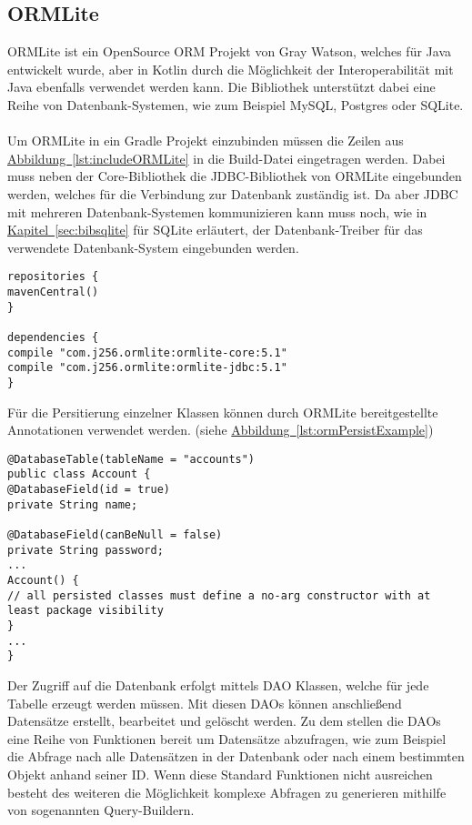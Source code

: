 \subsection{ORMLite}\label{sec:bibormlite}
ORMLite ist ein OpenSource \gls{ORM} Projekt von Gray Watson, welches für Java entwickelt wurde, aber in Kotlin durch die Möglichkeit der Interoperabilität mit Java ebenfalls verwendet werden kann. Die Bibliothek unterstützt dabei eine Reihe von Datenbank-Systemen, wie zum Beispiel MySQL, Postgres oder SQLite.\\
\\
Um ORMLite in ein Gradle Projekt einzubinden müssen die Zeilen aus \hyperref[lst:includeORMLite]{Abbildung~\ref{lst:includeORMLite}} in die Build-Datei eingetragen werden. Dabei muss neben der Core-Bibliothek die \gls{JDBC}-Bibliothek von ORMLite eingebunden werden, welches für die Verbindung zur Datenbank zuständig ist. Da aber \gls{JDBC} mit mehreren Datenbank-Systemen kommunizieren kann muss noch, wie in \hyperref[sec:bibsqlite]{Kapitel~\ref{sec:bibsqlite}} für SQLite erläutert, der Datenbank-Treiber für das verwendete Datenbank-System eingebunden werden.
\begin{lstlisting}[style=lstStyleFramed, caption={Einbindung der Bibliothek ORMLite mithilfe von Gradle}, label=lst:includeORMLite]
repositories {
mavenCentral()
}

dependencies {
compile "com.j256.ormlite:ormlite-core:5.1"
compile "com.j256.ormlite:ormlite-jdbc:5.1"
}
\end{lstlisting}
Für die Persitierung einzelner Klassen können durch ORMLite bereitgestellte Annotationen verwendet werden. (siehe \hyperref[lst:ormPersistExample]{Abbildung~\ref{lst:ormPersistExample}})
\begin{lstlisting}[style=lstStyleFramed, caption={[Beispiel: Persistierung einer Klasse mittels ORMLite\protect\footnote{Quelle: \cite{ormlite}}]Beispiel: Persistierung einer Klasse mittels ORMLite\protect\footnotemark},label=lst:ormPersistExample]
@DatabaseTable(tableName = "accounts")
public class Account {
@DatabaseField(id = true)
private String name;

@DatabaseField(canBeNull = false)
private String password;
...
Account() {
// all persisted classes must define a no-arg constructor with at least package visibility
}
...    
}
\end{lstlisting}
Der Zugriff auf die Datenbank erfolgt mittels \gls{DAO} Klassen, welche für jede Tabelle erzeugt werden müssen. Mit diesen \glspl{DAO} können anschließend Datensätze erstellt, bearbeitet und gelöscht werden. Zu dem stellen die \glspl{DAO} eine Reihe von Funktionen bereit um Datensätze abzufragen, wie zum Beispiel die Abfrage nach alle Datensätzen in der Datenbank oder nach einem bestimmten Objekt anhand seiner ID. Wenn diese Standard Funktionen nicht ausreichen besteht des weiteren die Möglichkeit komplexe Abfragen zu generieren mithilfe von sogenannten Query-Buildern.
